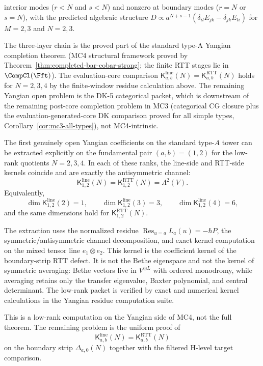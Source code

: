 \begin{computation}
\begin{itemize}
 interior modes ($r < N$ and $s < N$) and nonzero at boundary
 modes ($r = N$ or $s = N$), with the predicted algebraic structure
 $D \propto a^{N+s-1}(\delta_{il}E_{jk} - \delta_{jk}E_{li})$
 for $M = 2, 3$ and $N = 2, 3$.
\end{itemize}
The three-layer chain is the proved part of the standard type-A
Yangian completion theorem (MC4 structural framework proved by Theorem~\ref{thm:completed-bar-cobar-strong}; the finite RTT stages lie in $\CompCl(\Fft)$). The evaluation-core comparison
$\mathsf{K}^{\mathrm{line}}_{a,b}(N) = \mathsf{K}^{\mathrm{RTT}}_{a,b}(N)$
holds for $N = 2,3,4$ by the finite-window residue calculation above.
The remaining Yangian
open problem is the DK-5 categorical packet, which is downstream of
the remaining post-core completion problem in
MC3 \textup{(}categorical CG closure plus the evaluation-generated-core
DK comparison proved for all simple types,
Corollary~\ref{cor:mc3-all-types}\textup{)},
not MC4-intrinsic.
\end{computation}

\begin{computation}
\label{comp:mc4-yangian-lowrank-kernels}
The first genuinely open Yangian coefficients on the standard
type-$A$ tower can be extracted explicitly on the fundamental pair
$(a,b)=(1,2)$ for the low-rank quotients $N=2,3,4$. In each of these
ranks, the line-side and RTT-side kernels coincide and are exactly the
antisymmetric channel:
\[
\mathsf{K}^{\mathrm{line}}_{1,2}(N)
=
\mathsf{K}^{\mathrm{RTT}}_{1,2}(N)
=
\Lambda^2(V).
\]
Equivalently,
\[
\dim \mathsf{K}^{\mathrm{line}}_{1,2}(2)=1,\qquad
\dim \mathsf{K}^{\mathrm{line}}_{1,2}(3)=3,\qquad
\dim \mathsf{K}^{\mathrm{line}}_{1,2}(4)=6,
\]
and the same dimensions hold for
$\mathsf{K}^{\mathrm{RTT}}_{1,2}(N)$.

The extraction uses the normalized residue
$\operatorname*{Res}_{u=a}L_a(u)=-\hbar P$, the symmetric/antisymmetric
channel decomposition, and exact kernel computation on the mixed
tensor line $e_1\otimes e_2$. This kernel is the coefficient kernel of
the boundary-strip RTT defect. It is not the Bethe eigenspace and not
the kernel of symmetric averaging: Bethe vectors live in
$V^{\otimes L}$ with ordered monodromy, while averaging retains only
the transfer eigenvalue, Baxter polynomial, and central determinant.
The low-rank packet is verified by exact and numerical kernel
calculations in the Yangian residue computation suite.

This is a low-rank computation on the Yangian side of MC4, not the
full theorem. The remaining problem is the uniform proof of
\[
\mathsf{K}^{\mathrm{line}}_{a,b}(N)
=
\mathsf{K}^{\mathrm{RTT}}_{a,b}(N)
\]
on the boundary strip $\Delta_{a,0}(N)$ together with the filtered
H-level target comparison.
\end{computation}

